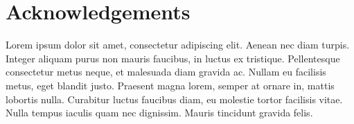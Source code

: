 \chapter{Acknowledgements}

Lorem ipsum dolor sit amet, consectetur adipiscing elit. Aenean nec diam turpis. Integer aliquam purus non mauris faucibus, in luctus ex tristique. Pellentesque consectetur metus neque, et malesuada diam gravida ac. Nullam eu facilisis metus, eget blandit justo. Praesent magna lorem, semper at ornare in, mattis lobortis nulla. Curabitur luctus faucibus diam, eu molestie tortor facilisis vitae. Nulla tempus iaculis quam nec dignissim. Mauris tincidunt gravida felis. 